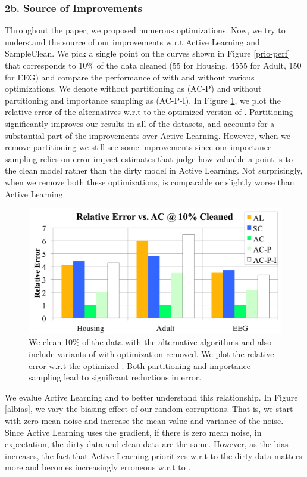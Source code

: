 \subsubsection{2b. Source of Improvements}
Throughout the paper, we proposed numerous optimizations.
Now, we try to understand the source of our improvements w.r.t Active Learning and SampleClean.
We pick a single point on the curves shown in Figure \ref{prio-perf} that corresponds to 10\% of the data cleaned (55 for Housing, 4555 for Adult, 150 for EEG) and compare the performance of \sys with and without various optimizations.
We denote \sys without partitioning as (AC-P) and \sys without partitioning and importance sampling as (AC-P-I).
In Figure \ref{opts}, we plot the relative error of the alternatives w.r.t to the optimized version of \sys.
Partitioning significantly improves our results in all of the datasets, and accounts for a substantial part of the improvements over Active Learning.
However, when we remove partitioning we still see some improvements since our importance sampling relies on error impact estimates that judge how valuable a point is to the clean model rather than the dirty model in Active Learning.
Not surprisingly, when we remove both these optimizations, \sys is comparable or slightly worse than Active Learning.

\begin{figure}[ht!]
\centering
 \includegraphics[width=\columnwidth]{exp/exp8.png}
 \caption{We clean 10\% of the data with the alternative algorithms and also include variants of \sys with optimization removed. We plot the relative error w.r.t the optimized \sys. Both partitioning and importance sampling lead to significant reductions in error. \label{opts}}
\end{figure}

We evalue Active Learning and \sys to better understand this relationship.
In Figure \ref{albias}, we vary the biasing effect of our random corruptions.
That is, we start with zero mean noise and increase the mean value and variance of the noise.
Since Active Learning uses the gradient, if there is zero mean noise, in expectation, the dirty data and clean data are the same.
However, as the bias increases, the fact that Active Learning prioritizes w.r.t to the dirty data matters more and becomes increasingly erroneous w.r.t to \sys.

